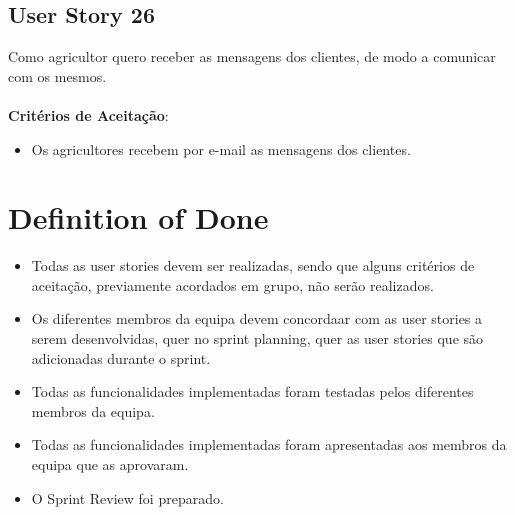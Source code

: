 \documentclass[a4paper,11pt]{article}
\begin{document}
\subsection{User Story 26}
Como agricultor quero receber as mensagens dos clientes, de modo a comunicar com os mesmos.\\\\
\textbf{Critérios de Aceitação}:
\begin{itemize}
  \item Os agricultores recebem por e-mail as mensagens dos clientes.
\end{itemize}

\section{Definition of Done}
\begin{itemize}
  \item Todas as user stories devem ser realizadas, sendo que alguns critérios de aceitação, previamente acordados em grupo, não serão realizados.
  \item Os diferentes membros da equipa devem concordaar com as user stories a serem desenvolvidas, quer no sprint planning, quer as user stories que são adicionadas durante o sprint.
  \item Todas as funcionalidades implementadas foram testadas pelos diferentes membros da equipa.
  \item Todas as funcionalidades implementadas foram apresentadas aos membros da equipa que as aprovaram.
  \item O Sprint Review foi preparado.
\end{itemize}
\end{document}

